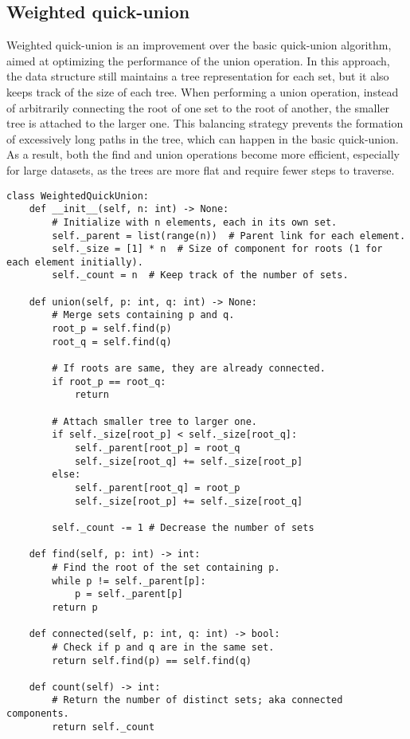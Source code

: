 \documentclass{article}
\begin{document}
\subsection{Weighted quick-union}

Weighted quick-union is an improvement over the basic quick-union algorithm, aimed at optimizing the performance of the union operation. In this approach, the data structure still maintains a tree representation for each set, but it also keeps track of the size of each tree. When performing a union operation, instead of arbitrarily connecting the root of one set to the root of another, the smaller tree is attached to the larger one. This balancing strategy prevents the formation of excessively long paths in the tree, which can happen in the basic quick-union. As a result, both the find and union operations become more efficient, especially for large datasets, as the trees are more flat and require fewer steps to traverse.

\begin{verbatim}
class WeightedQuickUnion:
    def __init__(self, n: int) -> None:
        # Initialize with n elements, each in its own set.
        self._parent = list(range(n))  # Parent link for each element.
        self._size = [1] * n  # Size of component for roots (1 for each element initially).
        self._count = n  # Keep track of the number of sets.

    def union(self, p: int, q: int) -> None:
        # Merge sets containing p and q.
        root_p = self.find(p)
        root_q = self.find(q)

        # If roots are same, they are already connected.
        if root_p == root_q:
            return

        # Attach smaller tree to larger one.
        if self._size[root_p] < self._size[root_q]:
            self._parent[root_p] = root_q
            self._size[root_q] += self._size[root_p]
        else:
            self._parent[root_q] = root_p
            self._size[root_p] += self._size[root_q]
            
        self._count -= 1 # Decrease the number of sets
        
    def find(self, p: int) -> int:
        # Find the root of the set containing p.
        while p != self._parent[p]:
            p = self._parent[p]
        return p

    def connected(self, p: int, q: int) -> bool:
        # Check if p and q are in the same set.
        return self.find(p) == self.find(q)
    
    def count(self) -> int:
        # Return the number of distinct sets; aka connected components.
        return self._count
\end{verbatim}
\end{document}
